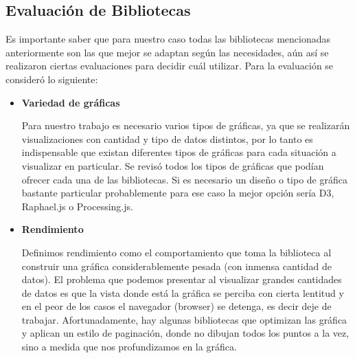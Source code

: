 \subsection{Evaluación de Bibliotecas}
Es importante saber que para nuestro caso todas las bibliotecas mencionadas anteriormente son las que mejor se adaptan según las necesidades, aún así se realizaron ciertas evaluaciones para decidir cuál utilizar. Para la evaluación se consideró lo siguiente:

\begin{itemize}
\item \textbf{Variedad de gráficas}

Para nuestro trabajo es necesario varios tipos de gráficas, ya que se realizarán visualizaciones con cantidad y tipo de datos distintos, por lo tanto es indispensable que existan diferentes tipos de gráficas para cada situación a visualizar en particular. Se revisó todos los tipos de gráficas que podían ofrecer cada una de las bibliotecas. Si es necesario un diseño o tipo de gráfica bastante particular probablemente para ese caso la mejor opción sería D3, Raphael.js o Processing.js.

\item \textbf{Rendimiento}

Definimos rendimiento como el comportamiento que toma la biblioteca al construir una gráfica considerablemente pesada (con inmensa cantidad de datos). El problema que podemos presentar al visualizar grandes cantidades de datos es que la vista donde está la gráfica se perciba con cierta lentitud y en el peor de los casos el navegador (browser) se detenga, es decir deje de trabajar. Afortunadamente, hay algunas bibliotecas que optimizan las gráfica y aplican un estilo de paginación, donde no dibujan todos los puntos a la vez, sino a medida que nos profundizamos en la gráfica.


\end{itemize}

